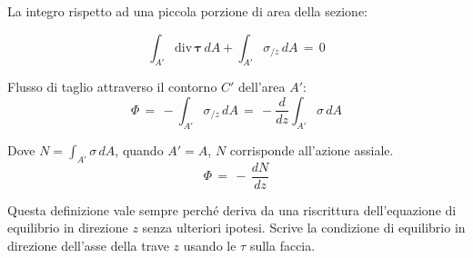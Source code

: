 La integro rispetto ad una piccola porzione di area della sezione:

\begin{equation*}
    \int_{A'}    \mathrm{div}\, \boldsymbol{\tau}  \, dA   +     \int_{A'}  \sigma_{/z} \,   dA   \,=\,0
\end{equation*}

\begin{definizioneBox}
    Flusso di taglio attraverso il contorno $C'$ dell'area $A'$:
    \begin{equation*}
    \Phi \,=\,   - \int_{A'}  \sigma_{/z} \,   dA   \,=\,- \frac{d}{dz}\int_{A'}  \sigma \,   dA
\end{equation*}

Dove $N =\int_{A'}  \sigma \,   dA $, quando $A'=A$, $N$ corrisponde all'azione assiale.
 \begin{equation*}
    \Phi \,=\,  - \,\frac{dN}{dz}
\end{equation*}

Questa definizione vale sempre perché deriva da una riscrittura dell'equazione di equilibrio in direzione $z$ senza ulteriori ipotesi. Scrive la condizione di equilibrio in direzione dell'asse della trave $z$ usando le $\tau$ sulla faccia.
\end{definizioneBox}


